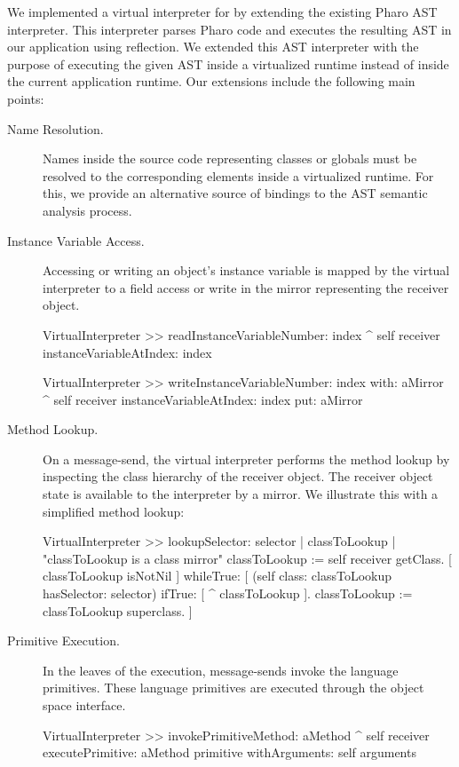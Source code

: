 We implemented a virtual interpreter for \Vtt by extending the existing Pharo AST interpreter. This interpreter parses Pharo code and executes the resulting AST in our application using reflection. We extended this AST interpreter with the purpose of executing the given AST inside a virtualized runtime instead of inside the current application runtime. Our extensions include the following main points:

\begin{description}
\item[Name Resolution.] Names inside the source code representing \eg classes or globals must be resolved to the corresponding elements inside a virtualized runtime. For this, we provide an alternative source of bindings to the AST semantic analysis process.

\item[Instance Variable Access.] Accessing or writing an object's instance variable is mapped by the virtual interpreter to a field access or write in the mirror representing the receiver object.

\begin{code}
VirtualInterpreter >> readInstanceVariableNumber: index
    ^ self receiver instanceVariableAtIndex: index
    
VirtualInterpreter >> writeInstanceVariableNumber: index with: aMirror
    ^ self receiver instanceVariableAtIndex: index put: aMirror
\end{code}

\item[Method Lookup.] On a message-send, the virtual interpreter performs the method lookup by inspecting the class hierarchy of the receiver object. The receiver object state is available to the interpreter by a mirror. We illustrate this with a simplified method lookup:

\begin{code}
VirtualInterpreter >> lookupSelector: selector
    | classToLookup |
    "classToLookup is a class mirror"
    classToLookup := self receiver getClass.
    [ classToLookup isNotNil ] whileTrue: [
        (self class: classToLookup hasSelector: selector)
        	    ifTrue: [ ^ classToLookup ].
	classToLookup := classToLookup superclass.
    ]
\end{code}

\item[Primitive Execution.] In the leaves of the execution, message-sends invoke the language primitives. These language primitives are executed through the object space interface.

\begin{code}
VirtualInterpreter >> invokePrimitiveMethod: aMethod
    ^ self receiver
         executePrimitive: aMethod primitive
         withArguments: self arguments
\end{code}

\end{description}

